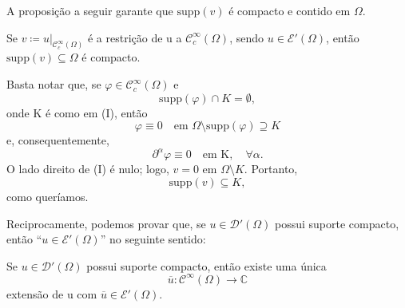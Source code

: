 \documentclass[../distribution_theory_notes.tex]{subfiles}
\begin{document}
A proposição a seguir garante que \(\mathrm{supp}(v)\) é compacto e contido em \(\Omega \).
\begin{prop*}
	Se \(v\coloneqq u|_{\mathcal{C}_{c}^{\infty}(\Omega )}\) é a restrição de u a \(\mathcal{C}_{c}^{\infty}(\Omega )\), sendo \(u\in \mathcal{E}'(\Omega )\), então \(\mathrm{supp}(v)\subseteq \Omega \) é compacto.
\end{prop*}
\begin{proof*}
	Basta notar que, se \(\varphi \in \mathcal{C}_{c}^{\infty}(\Omega )\) e
	\[
		\mathrm{supp}(\varphi )\cap K=\emptyset,
	\]
	onde K é como em (I), então
	\[
		\varphi \equiv 0\quad \text{em }\Omega \setminus \mathrm{supp}(\varphi )\supseteq K
	\]
	e, consequentemente,
	\[
		\partial ^{\alpha }\varphi \equiv 0\quad \text{em K},\quad \forall \alpha .
	\]
	O lado direito de (I) é nulo; logo, \(v=0\) em \(\Omega \setminus K\). Portanto,
	\[
		\mathrm{supp}(v)\subseteq K,
	\]
	como queríamos. \qedsymbol
\end{proof*}

Reciprocamente, podemos provar que, se \(u\in \mathcal{D}'(\Omega )\) possui suporte compacto, então ``\(u\in \mathcal{E}'(\Omega )\)'' no seguinte sentido:
\begin{prop*}
	Se \(u\in \mathcal{D}'(\Omega )\) possui suporte compacto, então existe uma única
	\[
		\overline{u}:\mathcal{C}^{\infty}(\Omega )\longrightarrow \mathbb{C}
	\]
	extensão de u com \(\overline{u}\in \mathcal{E}'(\Omega )\).
\end{prop*}
\end{document}
